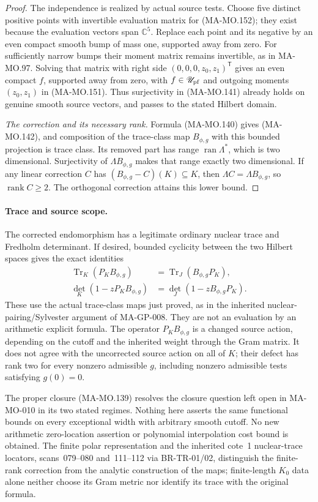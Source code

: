 \begin{proof}
The independence is realized by actual source tests. Choose
five distinct positive points with invertible evaluation
matrix for (MA-MO.152); they exist because the evaluation
vectors span \(\mathbb C^5\). Replace each point and its
negative by an even compact smooth bump of mass one,
supported away from zero. For sufficiently narrow bumps
their moment matrix remains invertible, as in MA-MO.97.
Solving that matrix with right side
\((0,0,0,z_0,z_1)^{\mathsf T}\) gives an even compact
\(f\), supported away from zero, with
\(f\in\mathscr U_{\rm pf}\) and outgoing moments
\((z_0,z_1)\) in (MA-MO.151). Thus surjectivity in
(MA-MO.141) already holds on genuine smooth source
vectors, and passes to the stated Hilbert domain.

\emph{The correction and its necessary rank.}
Formula (MA-MO.140) gives (MA-MO.142), and composition
of the trace-class map \(B_{\phi,g}\) with this bounded
projection is trace class. Its removed part has range
\(\operatorname{ran}\Lambda^*\), which is two dimensional.
Surjectivity of \(\Lambda B_{\phi,g}\) makes that range
exactly two dimensional. If any linear correction \(C\)
has \((B_{\phi,g}-C)(K)\subseteq K\), then
\(\Lambda C=\Lambda B_{\phi,g}\), so \(\operatorname{rank}C\ge2\).
The orthogonal correction attains this lower bound.
\end{proof}

\paragraph{Trace and source scope.}
The corrected endomorphism has a legitimate ordinary nuclear
trace and Fredholm determinant. If desired, bounded cyclicity
between the two Hilbert spaces gives the exact identities
\[
 \begin{aligned}
 \operatorname{Tr}_K(P_KB_{\phi,g})
      &=\operatorname{Tr}_J(B_{\phi,g}P_K),\\
 \det_K(1-zP_KB_{\phi,g})
      &=\det_J(1-zB_{\phi,g}P_K).
 \end{aligned}
 \tag{MA-MO.154}
\]
These use the actual trace-class maps just proved, as in
the inherited nuclear-pairing/Sylvester argument of MA-GP-008.
They are not an evaluation by an arithmetic explicit formula.
The operator \(P_KB_{\phi,g}\) is a changed source action,
depending on the cutoff and the inherited weight through
the Gram matrix. It does not agree with the uncorrected
source action on all of \(K\); their defect has rank two
for every nonzero admissible \(g\), including nonzero
admissible tests satisfying \(g(0)=0\).

The proper closure (MA-MO.139) resolves the closure question
left open in MA-MO-010 in its two stated regimes. Nothing
here asserts the same functional bounds on every exceptional
width with arbitrary smooth cutoff. No new arithmetic
zero-location assertion or polynomial interpolation cost
bound is obtained. The finite polar representation and
the inherited cote~1 nuclear-trace locators, scans~079--080
and~111--112 via BR-TR-01/02, distinguish the finite-rank
correction from the analytic construction of the maps;
finite-length \(K_0\) data alone neither choose its Gram
metric nor identify its trace with the original formula.
